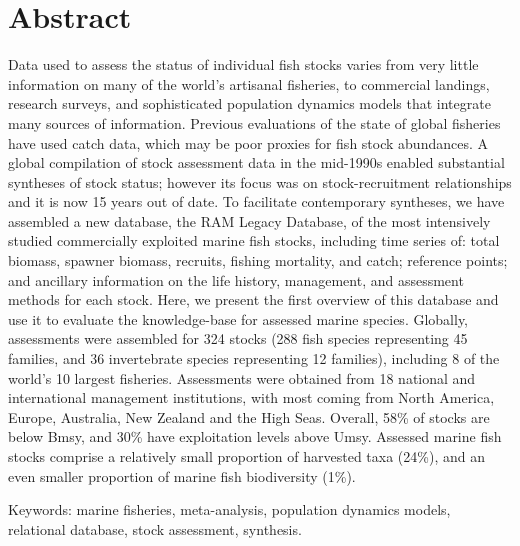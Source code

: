 \section*{Abstract}

Data used to assess the status of individual fish stocks varies from
very little information on many of the world's artisanal fisheries, to
commercial landings, research surveys, and sophisticated population
dynamics models that integrate many sources of information.  Previous
evaluations of the state of global fisheries have used catch data,
which may be poor proxies for fish stock abundances. A global
compilation of stock assessment data in the mid-1990s enabled
substantial syntheses of stock status; however its focus was on
stock-recruitment relationships and it is now 15 years out of date. To
facilitate contemporary syntheses, we have assembled a new database,
the RAM Legacy Database, of the most intensively studied commercially
exploited marine fish stocks, including time series of: total biomass,
spawner biomass, recruits, fishing mortality, and catch; reference
points; and ancillary information on the life history, management, and
assessment methods for each stock.  Here, we present the first
overview of this database and use it to evaluate the knowledge-base
for assessed marine species.  Globally, assessments were assembled for
324 stocks (288 fish species
representing 45 families, and
36 invertebrate species representing
12 families), including 8 of the world's 10
largest fisheries. Assessments were obtained from 18 national and
international management institutions, with most coming from North
America, Europe, Australia, New Zealand and the High Seas.  Overall,
58\% of stocks are below Bmsy, and 30\% have exploitation levels above
Umsy.  Assessed marine fish stocks comprise a relatively small
proportion of harvested taxa (24\%), and an even smaller proportion of
marine fish biodiversity (1\%).



\noindent Keywords: marine fisheries, meta-analysis, population dynamics models, relational database, stock assessment, synthesis.


